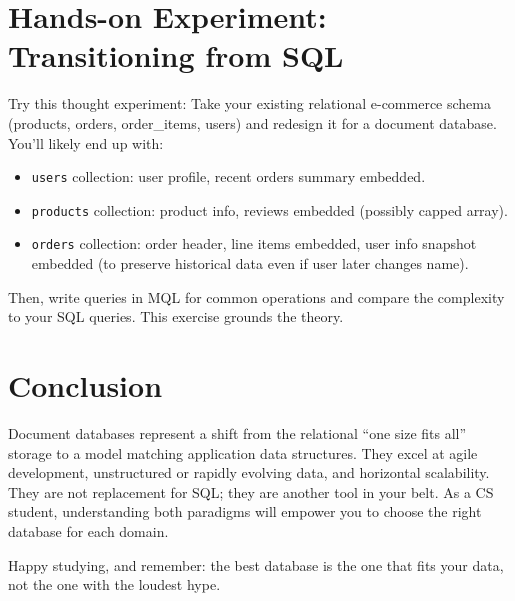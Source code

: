 \documentclass[12pt,a4paper]{article}
\begin{document}
\section{Hands-on Experiment: Transitioning from SQL}
Try this thought experiment: Take your existing relational e-commerce schema (products, orders, order\_items, users) and redesign it for a document database. You'll likely end up with:
\begin{itemize}
    \item \texttt{users} collection: user profile, recent orders summary embedded.
    \item \texttt{products} collection: product info, reviews embedded (possibly capped array).
    \item \texttt{orders} collection: order header, line items embedded, user info snapshot embedded (to preserve historical data even if user later changes name).
\end{itemize}
Then, write queries in MQL for common operations and compare the complexity to your SQL queries. This exercise grounds the theory.

\section{Conclusion}
Document databases represent a shift from the relational ``one size fits all'' storage to a model matching application data structures. They excel at agile development, unstructured or rapidly evolving data, and horizontal scalability. They are not replacement for SQL; they are another tool in your belt. As a CS student, understanding both paradigms will empower you to choose the right database for each domain.

\vspace{5mm}
Happy studying, and remember: the best database is the one that fits your data, not the one with the loudest hype.
\end{document}
